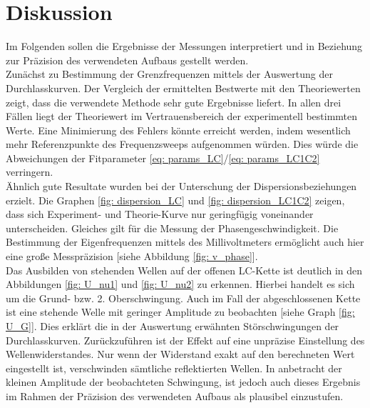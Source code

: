\section{Diskussion}
Im Folgenden sollen die Ergebnisse der Messungen interpretiert und in Beziehung zur Präzision des verwendeten Aufbaus gestellt werden. \\
Zunächst zu Bestimmung der Grenzfrequenzen mittels der Auswertung der Durchlasskurven. Der Vergleich
der ermittelten Bestwerte mit den Theoriewerten zeigt, dass die verwendete Methode sehr gute Ergebnisse liefert.
In allen drei Fällen liegt der Theoriewert im Vertrauensbereich der experimentell bestimmten Werte. Eine Minimierung
des Fehlers könnte erreicht werden, indem wesentlich mehr Referenzpunkte des Frequenzsweeps aufgenommen würden. Dies würde
die Abweichungen der Fitparameter \eqref{eq: params_LC}/\eqref{eq: params_LC1C2} verringern. \\
Ähnlich gute Resultate wurden bei der Unterschung der Dispersionsbeziehungen erzielt. Die Graphen \ref{fig: dispersion_LC} und \ref{fig: dispersion_LC1C2}
zeigen, dass sich Experiment- und Theorie-Kurve nur geringfügig voneinander unterscheiden. Gleiches gilt
für die Messung der Phasengeschwindigkeit. Die Bestimmung der Eigenfrequenzen mittels des Millivoltmeters ermöglicht
auch hier eine große Messpräzision [siehe Abbildung \ref{fig: v_phase}].\\
Das Ausbilden von stehenden Wellen auf der offenen LC-Kette ist deutlich in den Abbildungen \ref{fig: U_nu1} und \ref{fig: U_nu2}
zu erkennen. Hierbei handelt es sich um die Grund- bzw. 2. Oberschwingung. Auch im Fall
der abgeschlossenen Kette ist eine stehende Welle mit geringer Amplitude zu beobachten [siehe Graph \ref{fig: U_G}]. Dies erklärt
die in der Auswertung erwähnten Störschwingungen der Durchlasskurven. Zurückzuführen ist der Effekt auf eine unpräzise
Einstellung des Wellenwiderstandes. Nur wenn der Widerstand exakt auf den berechneten
Wert eingestellt ist, verschwinden sämtliche reflektierten Wellen. In anbetracht der kleinen Amplitude der beobachteten
Schwingung, ist jedoch auch dieses Ergebnis im Rahmen der Präzision des verwendeten Aufbaus als plausibel einzustufen.
